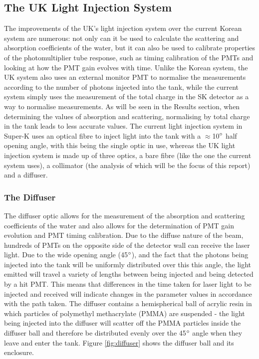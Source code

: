 \documentclass[11pt,oneside,a4paper]{article}
\begin{document}
\subsection{The UK Light Injection System}

The improvements of the UK's light injection system over the current Korean system are numerous: not only can it be used to calculate the scattering and absorption coefficients of the water, but it can also be used to calibrate properties of the photomultiplier tube response, such as timing calibration of the PMTs and looking at how the PMT gain evolves with time. Unlike the Korean system, the UK system also uses an external monitor PMT to normalise the measurements according to the number of photons injected into the tank, while the current system simply uses the measurement of the total charge in the SK detector as a way to normalise measurements. As will be seen in the Results section, when determining the values of absorption and scattering, normalising by total charge in the tank leads to less accurate values. The current light injection system in Super-K uses an optical fibre to inject light into the tank with a $\approx$10$\degree$ half opening angle, with this being the single optic in use, whereas the UK light injection system is made up of three optics, a bare fibre (like the one the current system uses), a collimator (the analysis of which will be the focus of this report) and a diffuser. 

\subsubsection{The Diffuser}
The diffuser optic allows for the measurement of the absorption and scattering coefficients of the water and also allows for the determination of PMT gain evolution and PMT timing calibration. Due to the diffuse nature of the beam, hundreds of PMTs on the opposite side of the detector wall can receive the laser light. Due to the wide opening angle (45$\degree$), and the fact that the photons being injected into the tank will be uniformly distributed over this this angle, the light emitted will travel a variety of lengths between being injected and being detected by a hit PMT. This means that differences in the time taken for laser light to be injected and received will indicate changes in the parameter values in accordance with the path taken.
The diffuser contains a hemispherical ball of acrylic resin in which particles of polymethyl methacrylate (PMMA) are suspended - the light being injected into the diffuser will scatter off the PMMA particles inside the diffuser ball and therefore be distributed evenly over the 45$\degree$ angle when they leave and enter the tank. \cite{diffuser} Figure \ref{fig:diffuser} shows the diffuser ball and its enclosure.
\end{document}
